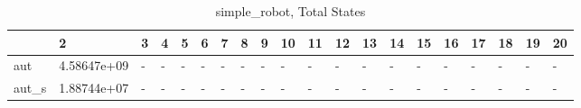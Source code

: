 \begin{table}
\caption{simple_robot, Total States}
\label{simple_robot_total}
\begin{tabular}{llllllllllllllllllll}
\toprule
 & 2 & 3 & 4 & 5 & 6 & 7 & 8 & 9 & 10 & 11 & 12 & 13 & 14 & 15 & 16 & 17 & 18 & 19 & 20 \\
\midrule
aut & 4.58647e+09 & - & - & - & - & - & - & - & - & - & - & - & - & - & - & - & - & - & - \\
aut_s & 1.88744e+07 & - & - & - & - & - & - & - & - & - & - & - & - & - & - & - & - & - & - \\
\bottomrule
\end{tabular}
\end{table}
